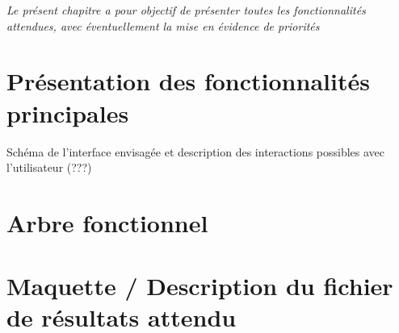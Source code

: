 
\textit{Le présent chapitre a pour objectif de présenter toutes les fonctionnalités attendues, avec éventuellement la mise en évidence de priorités}

\section{Présentation des fonctionnalités principales}

Schéma de l'interface envisagée et description des interactions possibles avec l'utilisateur (???)

\section{Arbre fonctionnel}

\section{Maquette / Description du fichier de résultats attendu}

